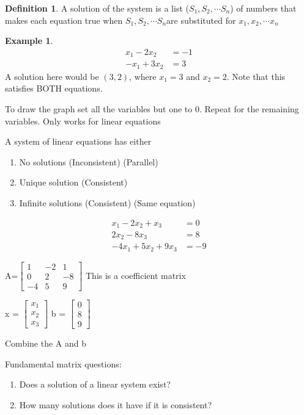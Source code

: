 \documentclass[11pt]{article}
\theoremstyle{definition}
\newtheorem{defn}{Definition}
\newtheorem{eg}{Example}
\begin{document}
\begin{defn}
A solution of the system is a list ($S_1, S_2, \cdots S_n$) of numbers that makes each equation true when $S_1, S_2, \cdots S_n$are substituted for $x_1, x_2, \cdots x_n$

\begin{eg}
\begin{align*}
x_1 -2x_2 &= -1 \\
-x_1 + 3x_2 &= 3
\end{align*}
A solution here would be $(3,2)$, where $x_1 = 3$ and $x_2 = 2$. Note that this satisfies BOTH equations.
\end{eg}
To draw the graph set all the variables but one to 0. Repeat for the remaining variables. Only works for linear equations

A system of linear equations has either 

\begin{enumerate}
 \item No solutions (Inconsistent) (Parallel)\\
 \item Unique solution (Consistent)\\
 \item Infinite solutions (Consistent) (Same equation)
\end{enumerate}

\begin{align*}
x_1 -2x_2 + x_3 &= 0 \\
2x_2 - 8x_3 &= 8 \\
-4x_1 + 5x_2 + 9x_3 &= -9
\end{align*}

A=$\begin{bmatrix}
 1 & -2 & 1 \\
 0& 2 & -8 \\
 -4 & 5 & 9
\end{bmatrix}$
This is a coefficient matrix

x = $\begin{bmatrix}
x_1 \\
x_2\\
x_3
\end{bmatrix}$
b = $\begin{bmatrix}
0 \\
8\\
9
\end{bmatrix}$

Combine the A and b

Fundamental matrix questions:
\begin{enumerate}
 \item Does a solution of a linear system exist? \\
 \item How many solutions does it have if it is consistent? \\
 \end{enumerate}


\end{defn}
\end{document}
